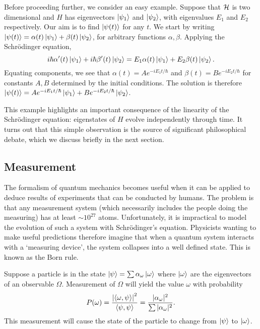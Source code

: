 \documentclass[a4paper]{article}
\begin{document}
Before proceeding further, we consider an easy example. Suppose that $\mathcal{H}$ is two dimensional and $H$ has eigenvectors $\left\lvert \psi_1 \right\rangle$ and $\left\lvert \psi_2 \right\rangle$, with eigenvalues $E_1$ and $E_2$ respectively. Our aim is to find $\left\lvert \psi(t) \right\rangle$ for any $t$. We start by writing $\left\lvert \psi(t) \right\rangle = \alpha(t) \left\lvert \psi_1 \right\rangle + \beta(t) \left\lvert \psi_2 \right\rangle$, for arbitrary functions $\alpha, \beta$. Applying the Schr\"{o}dinger equation, 
$$i\hbar \alpha'(t) \left\lvert \psi_1 \right\rangle + i\hbar \beta'(t) \left\lvert \psi_2 \right\rangle = E_1 \alpha(t) \left\lvert \psi_1 \right\rangle + E_2 \beta(t) \left\lvert \psi_2 \right\rangle.$$
Equating components, we see that $\alpha(t) = Ae^{-iE_1t/\hbar}$ and $\beta(t) = Be^{-iE_2t/\hbar}$ for constants $A, B$ determined by the initial conditions. The solution is therefore $\left\lvert \psi(t) \right\rangle = Ae^{-iE_1t/\hbar}\left\lvert \psi_1 \right\rangle + Be^{-iE_2t/\hbar}\left\lvert \psi_2 \right\rangle$. 

This example highlights an important consequence of the linearity of the Schr\"{o}dinger equation: eigenstates of $H$ evolve independently through time. It turns out that this simple observation is the source of significant philosophical debate, which we discuss briefly in the next section.

\subsection{Measurement}
The formalism of quantum mechanics becomes useful when it can be applied to deduce results of experiments that can be conducted by humans. The problem is that any measurement system (which necessarily includes the people doing the measuring) has at least $\sim 10^{27}$ atoms. Unfortunately, it is impractical to model the evolution of such a system with Schr\"{o}dinger's equation. Physicists wanting to make useful predictions therefore imagine that when a quantum system interacts with a `measuring device', the system collapses into a well defined state. This is known as the Born rule.

\begin{princ}
    Suppose a particle is in the state $\left\lvert \psi \right\rangle = \sum \alpha_\omega \left\lvert \omega \right\rangle$ where $\left\lvert \omega \right\rangle$ are the eigenvectors of an observable $\Omega$. Measurement of $\Omega$ will yield the value $\omega$ with probability $$P(\omega) = \frac{\left\lvert \left\langle \omega , \psi \right\rangle \right\rvert^2}{\left\langle \psi , \psi \right\rangle} = \frac{|\alpha_\omega|^2}{\sum |\alpha_\omega|^2}.$$ This measurement will cause the state of the particle to change from $\left\lvert \psi \right\rangle$ to $\left\lvert \omega \right\rangle$.
\end{princ}
\end{document}
